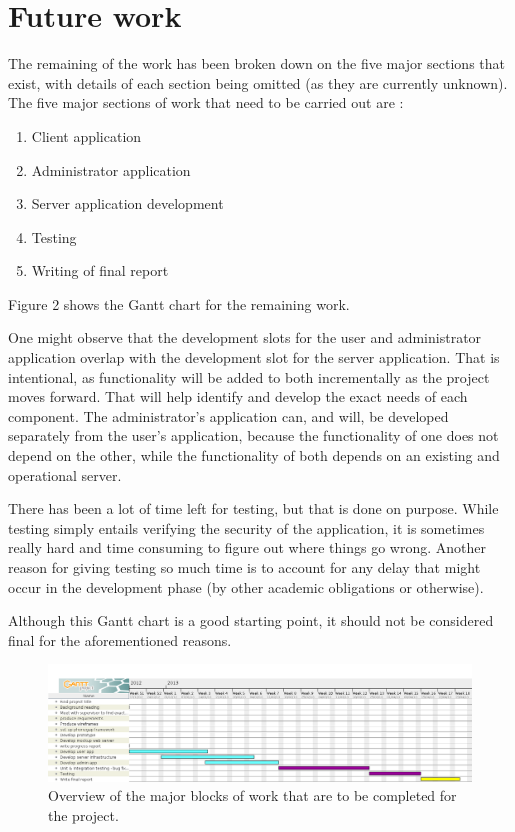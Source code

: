 \documentclass[12pt]{ecsproject}     %
\begin{document}
\pagebreak
\section{Future work}
The remaining of the work has been broken down on the five major sections that exist, with details of each section being omitted (as they are currently unknown). The five major sections of work that need to be carried out are :

\begin{enumerate}
\item Client application
\item Administrator application
\item Server application development
\item Testing
\item Writing of final report
\end{enumerate}

Figure 2 shows the Gantt chart for the remaining work.

One might observe that the development slots for the user and administrator application overlap with the development slot for the server application. That is intentional, as functionality will be added to both incrementally as the project moves forward. That will help identify and develop the exact needs of each component. The administrator's application can, and will, be developed separately from the user's application, because the functionality of one does not depend on the other, while the functionality of both depends on an existing and operational server.

There has been a lot of time left for testing, but that is done on purpose. While testing simply entails verifying the security of the application, it is sometimes really hard and time consuming to figure out where things go wrong. Another reason for giving testing so much time is to account for any delay that might occur in the development phase (by other academic obligations or otherwise).

Although this Gantt chart is a good starting point, it should not be considered final for the aforementioned reasons.

\begin{landscape}
\begin{figure}
\includegraphics[scale=0.5]{rem.png}
\caption{Overview of the major blocks of work that are to be completed for the project.}
\end{figure}
\end{landscape}
\end{document}
